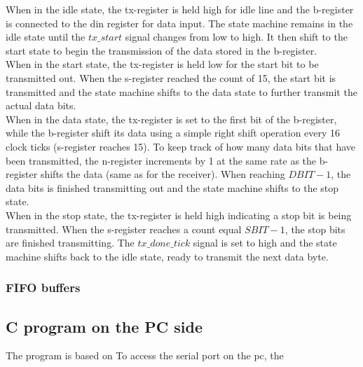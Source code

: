 \documentclass[main.tex]{subfiles}
\begin{document}
When in the idle state, the tx-register is held high for idle line and the b-register is connected to the din register for data input. The state machine remains in the idle state until the $tx\_start$ signal changes from low to high. It then shift to the start state to begin the transmission of the data stored in the b-register. \\

When in the start state, the tx-register is held low for the start bit to be transmitted out. When the s-register reached the count of 15, the start bit is transmitted and the state machine shifts to the data state to further transmit the actual data bits.\\

When in the data state, the tx-register is set to the first bit of the b-register, while the b-register shift its data using a simple right shift operation every 16 clock ticks (s-register reaches 15). To keep track of how many data bits that have been transmitted, the n-register increments by 1 at the same rate as the b-register shifts the data (same as for the receiver). When reaching $DBIT-1$, the data bits is finished transmitting out and the state machine shifts to the stop state.\\

When in the stop state, the tx-register is held high indicating a stop bit is being transmitted. When the s-register reaches a count equal $SBIT - 1$, the stop bits are finished transmitting. The $tx\_done\_tick$ signal is set to high and the state machine shifts back to the idle state, ready to transmit the next data byte.


\subsubsection{FIFO buffers}


\subsection{C program on the PC side}
The program is based on 
To access the serial port on the \gls{pc}, the 
\end{document}
